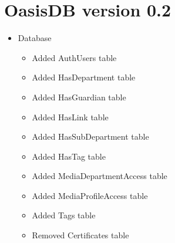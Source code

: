 \section{OasisDB version 0.2}
\begin{itemize}
	\item Database
	\begin{itemize}
		\item Added AuthUsers table
		\item Added HasDepartment table
		\item Added HasGuardian table
		\item Added HasLink table
		\item Added HasSubDepartment table
		\item Added HasTag table
		\item Added MediaDepartmentAccess table
		\item Added MediaProfileAccess table
		\item Added Tags table
		\item Removed Certificates table
	\end{itemize}
\end{itemize}

